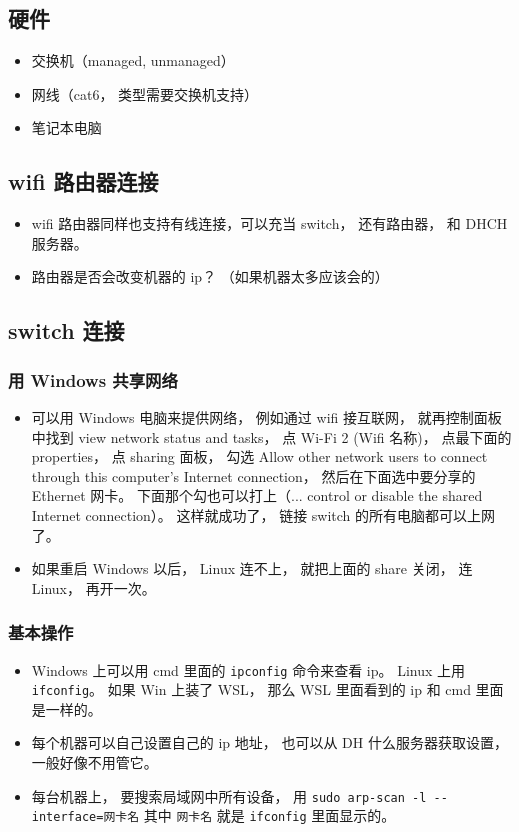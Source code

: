 
\begin{issues}
\issueDraft
\end{issues}

\subsection{硬件}
\begin{itemize}
\item 交换机（managed, unmanaged）
\item 网线（cat6， 类型需要交换机支持）
\item 笔记本电脑
\end{itemize}

\subsection{wifi 路由器连接}
\begin{itemize}
\item wifi 路由器同样也支持有线连接，可以充当 switch， 还有路由器， 和 DHCH 服务器。
\item 路由器是否会改变机器的 ip？ （如果机器太多应该会的）
\end{itemize}

\subsection{switch 连接}
\subsubsection{用 Windows 共享网络}
\begin{itemize}
\item 可以用 Windows 电脑来提供网络， 例如通过 wifi 接互联网， 就再控制面板中找到 view network status and tasks， 点 Wi-Fi 2 (Wifi 名称)， 点最下面的 properties， 点 sharing 面板， 勾选 Allow other network users to connect through this computer's Internet connection， 然后在下面选中要分享的 Ethernet 网卡。 下面那个勾也可以打上（... control or disable the shared Internet connection）。 这样就成功了， 链接 switch 的所有电脑都可以上网了。
\item 如果重启 Windows 以后， Linux 连不上， 就把上面的 share 关闭， 连 Linux， 再开一次。
\end{itemize}

\subsubsection{基本操作}
\begin{itemize}
\item Windows 上可以用 cmd 里面的 \verb|ipconfig| 命令来查看 ip。 Linux 上用 \verb|ifconfig|。 如果 Win 上装了 WSL， 那么 WSL 里面看到的 ip 和 cmd 里面是一样的。
\item 每个机器可以自己设置自己的 ip 地址， 也可以从 DH 什么服务器获取设置， 一般好像不用管它。
\item 每台机器上， 要搜索局域网中所有设备， 用 \verb|sudo arp-scan -l --interface=网卡名| 其中 \verb|网卡名| 就是 \verb|ifconfig| 里面显示的。
\end{itemize}

